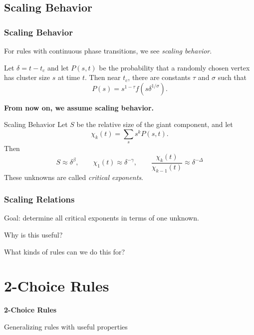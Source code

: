 \documentclass{beamer}
\begin{document}
\subsection{Scaling Behavior}

\begin{frame}
	\frametitle{Scaling Behavior}

	For rules with continuous phase transitions, we see \textit{scaling behavior}.
	\vspace{5mm}

	Let $\delta = t-t_c$ and let $P(s, t)$ be the probability that a randomly chosen vertex has cluster size $s$ at time $t$. Then near $t_c$, there are constants $\tau$ and $\sigma$ such that
	\[
		P(s) = s^{1-\tau}f(s \delta^{1/\sigma}).
	\]
	\vspace{5mm}

	\pause
	{\color{myblue}\bfseries From now on, we assume scaling behavior.}
\end{frame}

\begin{frame}{Scaling Behavior}
	Let $S$ be the relative size of the giant component, and let
	\[
		\chi_k(t) = \sum_s s^{k} P(s, t).
	\] Then
	\[
		S \approx \delta^{\beta}, \quad\quad
		\chi_1(t) \approx \delta^{-\gamma}, \quad\quad
		\frac{\chi_k(t)}{\chi_{k-1}(t)}  \approx \delta^{-\Delta}
	\]
	These unknowns are called \textit{critical exponents}.
\end{frame}

\begin{frame}
	\frametitle{Scaling Relations}

	Goal: determine all critical exponents in terms of one unknown.
	\vspace{5mm}

	Why is this useful?
	\vspace{5mm}

	\pause
	What kinds of rules can we do this for?
\end{frame}

\section{2-Choice Rules}

{
\begin{frame}
        \bfseries
        {\color{white}
                \huge 2-Choice Rules
        }
        \vspace{5mm}

        {\color{myblue}
		Generalizing rules with useful properties
        }
\end{frame}
}
\end{document}
